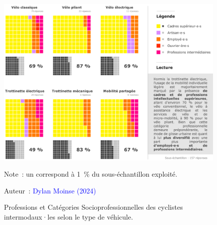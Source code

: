 \begin{refsegment}
    \begin{figure}[h!]\vspace*{4pt}
        \caption{Professions et Catégories Socioprofessionnelles des cyclistes intermodaux·les selon le type de véhicule.}
        \label{fig-chap4:pcs}
        \centerline{\includegraphics[width=1\columnwidth]{src/Figures/Chap-4/FR_PCS.pdf}}
        \vspace{5pt}
        \begin{flushleft}\scriptsize{
        Note~: un  correspond à 1~\% du sous-échantillon exploité.
        }\end{flushleft}
        \begin{flushright}\scriptsize{
        Auteur~: \textcolor{blue}{Dylan Moinse (2024)}
        }\end{flushright}
    \end{figure}


\end{refsegment}
